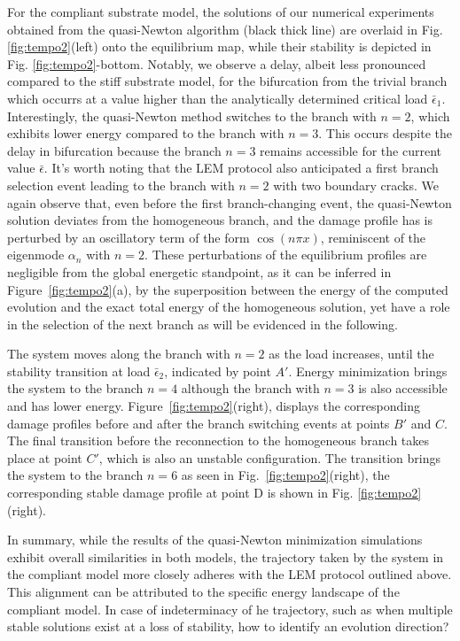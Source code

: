 \documentclass[10pt]{article}
\begin{document}
%
For the compliant substrate model, the solutions of our numerical experiments obtained from the quasi-Newton algorithm (black thick line) are overlaid in Fig. \ref{fig:tempo2}(left) onto the equilibrium map, while their stability is depicted in Fig. \ref{fig:tempo2}-bottom. Notably, we observe a delay, albeit less pronounced compared to the stiff substrate model, for the bifurcation from the trivial branch which occurrs at a value  higher than the analytically determined critical load \(\bar{\epsilon}_1\). Interestingly, the quasi-Newton method switches to the branch with $n=2$, which exhibits lower energy compared to the branch with $n=3$. This occurs  despite the delay in bifurcation because the branch  $n=3$ remains accessible for the current value $\bar\epsilon$. It's worth noting that the LEM protocol also anticipated a first branch selection event leading to the branch with $n=2$ with two boundary cracks.
We again observe that, even before the first branch-changing event, the quasi-Newton solution {deviates from the homogeneous branch, and the damage profile has} is perturbed by an oscillatory term of the form \(\cos(n\pi x)\), reminiscent of the eigenmode $\alpha_n$  with \(n=2\).
%
These perturbations of the equilibrium profiles are negligible from the global energetic standpoint, as it can be inferred in Figure~\ref{fig:tempo2}(a), by the superposition between the energy of the computed evolution and the exact total energy of the homogeneous solution, yet have a role in the selection of the next branch as will be evidenced in the following.

The system moves along the branch with $n=2$  as the load increases, until the stability transition at load $\bar \epsilon_2$, indicated by point $A'$. Energy minimization brings the system to the branch $n=4$ although the branch with $n=3$ is also accessible and has lower energy. Figure~\ref{fig:tempo2}(right), displays the corresponding damage profiles before and after {the branch} switching events  at points $B'$ and $C$. The final {transition} before the reconnection to the homogeneous branch takes place at point $C'$, which is also an unstable configuration. The transition brings the system to the branch $n=6$ as seen in Fig.~\ref{fig:tempo2}(right), the corresponding stable damage profile at point D is shown in Fig. \ref{fig:tempo2}(right).

In summary, while the results of the quasi-Newton minimization simulations exhibit overall similarities in both models, the trajectory taken by the system in the compliant model more closely adheres with the LEM protocol outlined above. This alignment can be attributed to the specific energy landscape of the compliant model. In case of indeterminacy of he trajectory, such as when multiple stable solutions exist at a loss of stability, how to identify an evolution direction?
\end{document}
